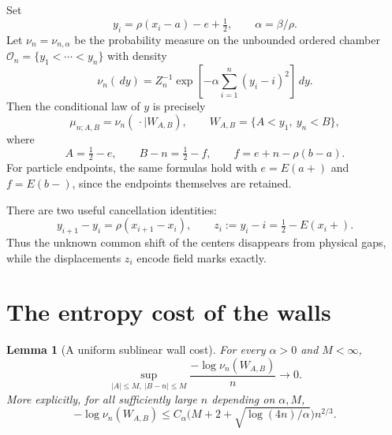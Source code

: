 \documentclass[11pt,reqno]{amsart}
\newtheorem{lemma}[theorem]{Lemma}
\theoremstyle{definition}
\theoremstyle{remark}
\newcommand{\1}{\mathbf 1}
\newcommand{\dd}{\,d}
\numberwithin{equation}{section}
\begin{document}
Set
\begin{equation}\label{eq:y}
 y_i=\rho(x_i-a)-e+\tfrac12,\qquad \alpha=\beta/\rho.
\end{equation}
Let $\nu_n=\nu_{n,\alpha}$ be the probability measure on the unbounded
ordered chamber $\mathcal O_n=\{y_1<\cdots<y_n\}$ with density
\begin{equation}\label{eq:nu}
 \nu_n(\dd y)=Z_n^{-1}
 \exp\left[-\alpha\sum_{i=1}^n(y_i-i)^2\right]\dd y.
\end{equation}
Then the conditional law of $y$ is precisely
\begin{equation}\label{eq:walls}
 \mu_{n;A,B}=\nu_n(\,\cdot\mid W_{A,B}),\qquad
 W_{A,B}=\{A<y_1,\ y_n<B\},
\end{equation}
where
\begin{equation}\label{eq:AB}
 A=\tfrac12-e,\qquad B-n=\tfrac12-f,
 \qquad f=e+n-\rho(b-a).
\end{equation}
For particle endpoints, the same formulas hold with $e=E(a+)$ and
$f=E(b-)$, since the endpoints themselves are retained.

There are two useful cancellation identities:
\begin{equation}\label{eq:marks}
 y_{i+1}-y_i=\rho(x_{i+1}-x_i),\qquad
 z_i:=y_i-i=\tfrac12-E(x_i+).
\end{equation}
Thus the unknown common shift of the centers disappears from physical
gaps, while the displacements $z_i$ encode field marks exactly.

\section{The entropy cost of the walls}\label{sec:wall}

\begin{lemma}[A uniform sublinear wall cost]\label{lem:wall}
For every $\alpha>0$ and $M<\infty$,
\begin{equation}\label{eq:wall-small}
 \sup_{|A|\le M,\ |B-n|\le M}
 \frac{-\log\nu_n(W_{A,B})}{n}\longrightarrow0.
\end{equation}
More explicitly, for all sufficiently large $n$ depending on $\alpha,M$,
\begin{equation}\label{eq:wall-rate}
 -\log\nu_n(W_{A,B})
 \le C_\alpha\big(M+2+\sqrt{\log(4n)/\alpha}\big)n^{2/3}.
\end{equation}
\end{lemma}
\end{document}

